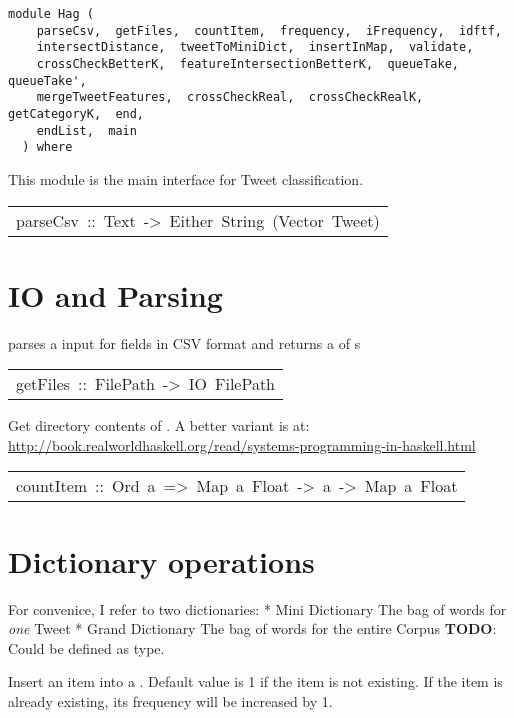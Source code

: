 \label{module:Hag}
\haddockbeginheader
{\haddockverb\begin{verbatim}
module Hag (
    parseCsv,  getFiles,  countItem,  frequency,  iFrequency,  idftf, 
    intersectDistance,  tweetToMiniDict,  insertInMap,  validate, 
    crossCheckBetterK,  featureIntersectionBetterK,  queueTake,  queueTake', 
    mergeTweetFeatures,  crossCheckReal,  crossCheckRealK,  getCategoryK,  end, 
    endList,  main
  ) where\end{verbatim}}
\haddockendheader

This module is the main interface for Tweet classification.\par

\begin{haddockdesc}
\item[\begin{tabular}{@{}l}
parseCsv\ ::\ Text\ ->\ Either\ String\ (Vector\ Tweet)
\end{tabular}]\haddockbegindoc
\section*{IO and Parsing}\par
{} parses a  input for fields in CSV format and
 returns a  of s\par

\end{haddockdesc}
\begin{haddockdesc}
\item[\begin{tabular}{@{}l}
getFiles\ ::\ FilePath\ ->\ IO\ {\char 91}FilePath{\char 93}
\end{tabular}]\haddockbegindoc
Get directory contents of . A better variant is at:
 \url{http://book.realworldhaskell.org/read/systems-programming-in-haskell.html}\par

\end{haddockdesc}
\begin{haddockdesc}
\item[\begin{tabular}{@{}l}
countItem\ ::\ Ord\ a\ =>\ Map\ a\ Float\ ->\ a\ ->\ Map\ a\ Float
\end{tabular}]\haddockbegindoc
\section*{Dictionary operations}\par
For convenice, I refer to two dictionaries:
 * Mini Dictionary
 The bag of words for \emph{one} Tweet
 * Grand Dictionary
 The bag of words for the entire Corpus
 \textbf{TODO}: Could be defined as type.\par
Insert an item into a . Default value is 1 if the item is
 not existing. If the item is already existing, its frequency will
 be increased by 1.\par

\end{haddockdesc}
